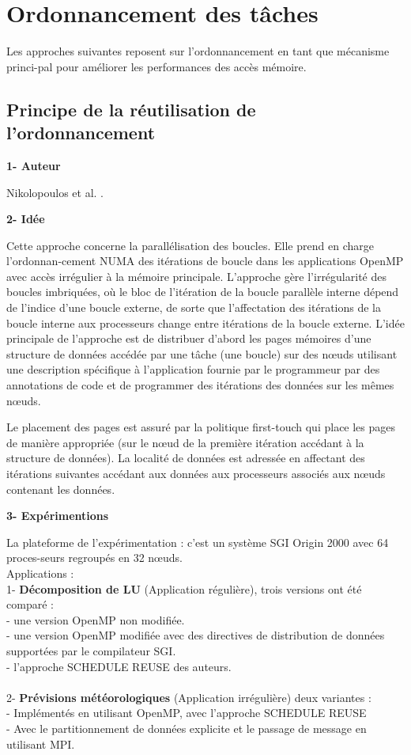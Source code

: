 \section{Ordonnancement des tâches}\label{ordoTKs}  %
%
Les approches suivantes reposent sur l'ordonnancement en tant que mécanisme princi-pal pour améliorer les performances des accès mémoire. 
\subsection{Principe de la réutilisation de l'ordonnancement}  
%
\textbf{1- Auteur}

Nikolopoulos et al. \cite{Nik01}.

\textbf{2- Idée}

Cette approche concerne la parallélisation des boucles. Elle prend en charge l'ordonnan-cement NUMA des itérations de boucle dans les applications OpenMP avec accès irrégulier à la mémoire principale. %
L'approche gère l'irrégularité des boucles imbriquées, où le bloc de l'itération de la boucle parallèle interne dépend de l'indice d'une boucle externe, de sorte que l'affectation des itérations de la boucle interne aux processeurs change entre itérations de la boucle externe. 
%
L'idée principale de l'approche est de distribuer d'abord les pages mémoires d'une structure de données accédée par une tâche (une boucle) sur des nœuds utilisant une description spécifique à l'application fournie par le programmeur par des annotations de code et de programmer des itérations des données sur les mêmes nœuds.
 
Le placement des pages est assuré par la politique first-touch qui place les pages de manière appropriée (sur le nœud de la première itération accédant à la structure de données). La localité de données est adressée en affectant des itérations suivantes accédant aux données aux processeurs associés aux nœuds contenant les données.

\textbf{3- Expérimentions}

La plateforme de l'expérimentation : c'est un système SGI Origin 2000 avec 64 proces-seurs regroupés en 32 nœuds.\\
Applications  :\\ 
1- \textbf{Décomposition de LU} (Application régulière), trois versions ont été comparé : \\
- une version OpenMP non modifiée. \\
- une version OpenMP modifiée avec des directives de distribution de données supportées par le compilateur SGI.\\
- l'approche SCHEDULE REUSE des auteurs.\\
\\
2- \textbf{Prévisions météorologiques} (Application irrégulière) deux variantes :\\
- Implémentés en utilisant OpenMP, avec l'approche SCHEDULE REUSE\\
- Avec le partitionnement de données explicite et le passage de message en utilisant MPI. 

